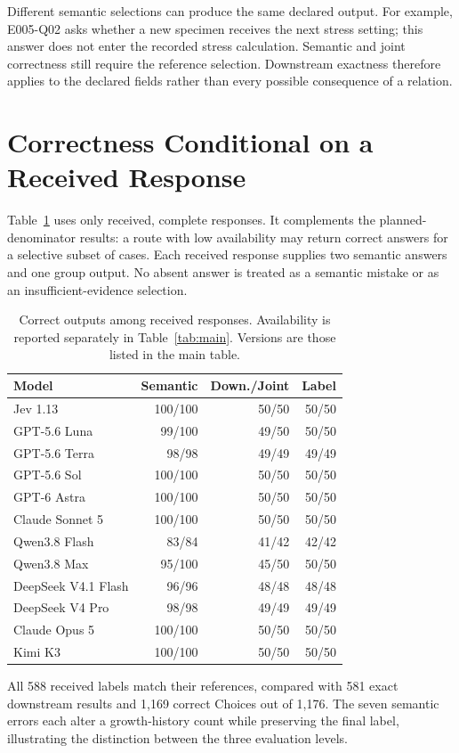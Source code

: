 Different semantic selections can produce the same declared output. For example, E005-Q02 asks whether a new specimen receives the next stress setting; this answer does not enter the recorded stress calculation. Semantic and joint correctness still require the reference selection. Downstream exactness therefore applies to the declared fields rather than every possible consequence of a relation.

\section{Correctness Conditional on a Received Response}
\label{app:observed}

Table~\ref{tab:observed} uses only received, complete responses. It complements the planned-denominator results: a route with low availability may return correct answers for a selective subset of cases. Each received response supplies two semantic answers and one group output. No absent answer is treated as a semantic mistake or as an insufficient-evidence selection.

\begin{table}[t]
\centering
\footnotesize
\setlength{\tabcolsep}{3pt}
\begin{tabular}{@{}lrrr@{}}
\toprule
Model & Semantic & Down./Joint & Label \\
\midrule
Jev 1.13 & 100/100 & 50/50 & 50/50 \\
GPT-5.6 Luna & 99/100 & 49/50 & 50/50 \\
GPT-5.6 Terra & 98/98 & 49/49 & 49/49 \\
GPT-5.6 Sol & 100/100 & 50/50 & 50/50 \\
GPT-6 Astra & 100/100 & 50/50 & 50/50 \\
Claude Sonnet 5 & 100/100 & 50/50 & 50/50 \\
Qwen3.8 Flash & 83/84 & 41/42 & 42/42 \\
Qwen3.8 Max & 95/100 & 45/50 & 50/50 \\
DeepSeek V4.1 Flash & 96/96 & 48/48 & 48/48 \\
DeepSeek V4 Pro & 98/98 & 49/49 & 49/49 \\
Claude Opus 5 & 100/100 & 50/50 & 50/50 \\
Kimi K3 & 100/100 & 50/50 & 50/50 \\
\bottomrule
\end{tabular}
\caption{Correct outputs among received responses. Availability is reported separately in Table~\ref{tab:main}. Versions are those listed in the main table.}
\label{tab:observed}
\end{table}

All 588 received labels match their references, compared with 581 exact downstream results and 1,169 correct Choices out of 1,176. The seven semantic errors each alter a growth-history count while preserving the final label, illustrating the distinction between the three evaluation levels.
